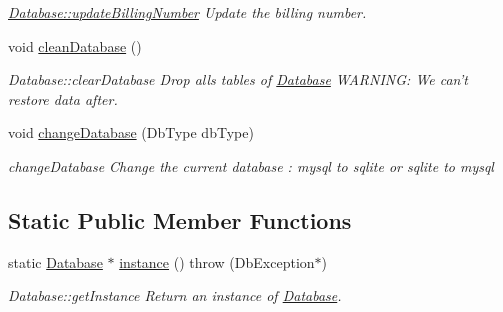 \begin{DoxyCompactItemize}
\begin{DoxyCompactList}\small\item\em \hyperlink{classDatabases_1_1Database_a17b652086514e0a64d0e452a938ac7a5}{Database\-::update\-Billing\-Number} Update the billing number. \end{DoxyCompactList}\item 
\hypertarget{classDatabases_1_1Database_a52c30975504e35c7c475a52817d66b73}{void \hyperlink{classDatabases_1_1Database_a52c30975504e35c7c475a52817d66b73}{clean\-Database} ()}\label{classDatabases_1_1Database_a52c30975504e35c7c475a52817d66b73}

\begin{DoxyCompactList}\small\item\em Database\-::clear\-Database Drop alls tables of \hyperlink{classDatabases_1_1Database}{Database} W\-A\-R\-N\-I\-N\-G\-: We can't restore data after. \end{DoxyCompactList}\item 
void \hyperlink{classDatabases_1_1Database_ab65cc5f7429f5671f1c8d57aae824a4b}{change\-Database} (Db\-Type db\-Type)
\begin{DoxyCompactList}\small\item\em change\-Database Change the current database \-: mysql to sqlite or sqlite to mysql \end{DoxyCompactList}\end{DoxyCompactItemize}
\subsection*{Static Public Member Functions}
\begin{DoxyCompactItemize}
\item 
static \hyperlink{classDatabases_1_1Database}{Database} $\ast$ \hyperlink{classDatabases_1_1Database_af75844a67cca710cc2d7edbff95ebe81}{instance} ()  throw (\-Db\-Exception$\ast$)
\begin{DoxyCompactList}\small\item\em Database\-::get\-Instance Return an instance of \hyperlink{classDatabases_1_1Database}{Database}. \end{DoxyCompactList}\end{DoxyCompactItemize}
